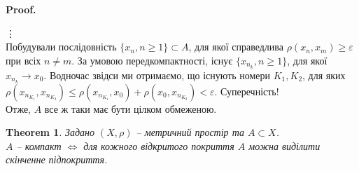 \documentclass[a4paper, 10pt]{article}
\makeatletter
\theoremstyle{theoremdd}
\newtheorem{theorem}{Theorem}[subsection]
\theoremstyle{theoremdd}
\theoremstyle{theoremdd}
\theoremstyle{theoremdd}
\theoremstyle{theoremdd}
\theoremstyle{theoremdd}
\theoremstyle{theoremdd}
\theoremstyle{theoremdd}
\renewenvironment{proof}[1][Proof.\\]{\par
\pushQED{\hfill \qed}%
\normalfont \topsep6\p@\@plus6\p@\relax
\trivlist
\item\relax
{\bfseries
#1\@addpunct{.}}\hspace\labelsep\ignorespaces
}{%
\popQED\endtrivlist\@endpefalse
}
\makeatother
\begin{document}
\begin{proof}
\vdots \\
Побудували послідовність $\{x_n, n \geq 1\} \subset A$, для якої справедлива $\rho(x_n,x_m) \geq \varepsilon$ при всіх $n \neq m$. За умовою передкомпактності, існує $\{x_{n_k}, n \geq 1\}$, для якої $x_{n_k} \to x_0$. Водночас звідси ми отримаємо, що існують номери $K_1,K_2$, для яких $\rho(x_{n_{K_1}}, x_{n_{K_2}}) \leq \rho(x_{n_{K_1}}, x_0) + \rho(x_0, x_{n_{K_2}}) < \varepsilon$. Суперечність!\\
Отже, $A$ все ж таки має бути цілком обмеженою.
\end{proof}

\begin{theorem}
Задано $(X,\rho)$ -- метричний простір та $A \subset X$.\\
$A$ -- компакт $\iff$ для кожного відкритого покриття $A$ можна виділити скінченне підпокриття.
\end{theorem}
\end{document}
